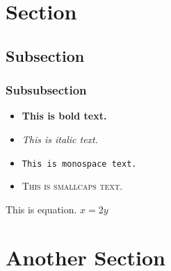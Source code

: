 \documentclass[english,palatino,basic]{ist-report}
\begin{document}


\section{Section}

\lipsum[1]

\subsection{Subsection}

\lipsum[1-2]

\subsubsection{Subsubsection}

\begin{itemize}
	\item \textbf{This is bold text.}
	\item \textit{This is italic text.}
	\item \texttt{This is monospace text.}
	\item \textsc{This is smallcaps text.}
\end{itemize}

This is equation. $x = 2y$

\section{Another Section}

\lipsum[1-3]
\end{document}
